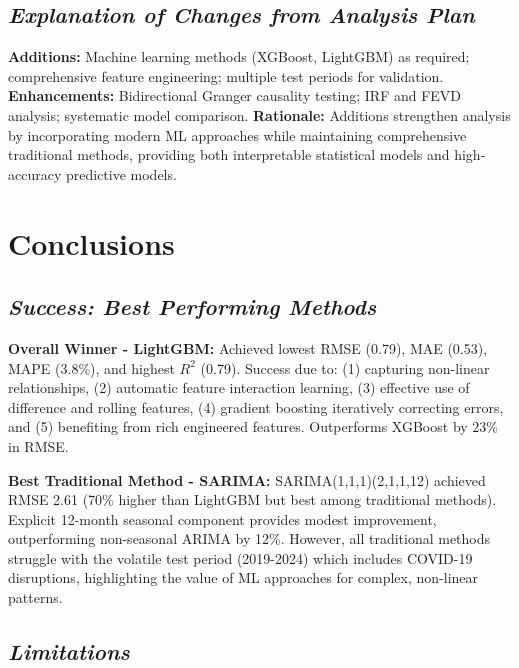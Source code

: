 \documentclass[12pt]{article}
\begin{document}
\subsection*{\textit{Explanation of Changes from Analysis Plan}}

\textbf{Additions:} Machine learning methods (XGBoost, LightGBM) as required; comprehensive feature engineering; multiple test periods for validation. \textbf{Enhancements:} Bidirectional Granger causality testing; IRF and FEVD analysis; systematic model comparison. \textbf{Rationale:} Additions strengthen analysis by incorporating modern ML approaches while maintaining comprehensive traditional methods, providing both interpretable statistical models and high-accuracy predictive models.

\section*{\textbf{Conclusions}}

\subsection*{\textit{Success: Best Performing Methods}}

\textbf{Overall Winner - LightGBM:} Achieved lowest RMSE (0.79), MAE (0.53), MAPE (3.8\%), and highest $R^2$ (0.79). Success due to: (1) capturing non-linear relationships, (2) automatic feature interaction learning, (3) effective use of difference and rolling features, (4) gradient boosting iteratively correcting errors, and (5) benefiting from rich engineered features. Outperforms XGBoost by 23\% in RMSE.

\textbf{Best Traditional Method - SARIMA:} SARIMA(1,1,1)(2,1,1,12) achieved RMSE 2.61 (70\% higher than LightGBM but best among traditional methods). Explicit 12-month seasonal component provides modest improvement, outperforming non-seasonal ARIMA by 12\%. However, all traditional methods struggle with the volatile test period (2019-2024) which includes COVID-19 disruptions, highlighting the value of ML approaches for complex, non-linear patterns.

\subsection*{\textit{Limitations}}
\end{document}

